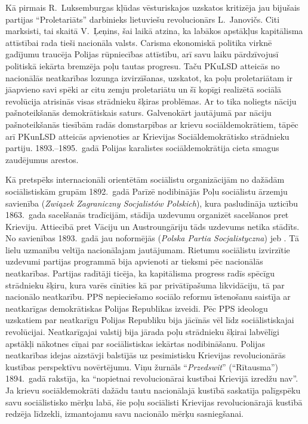 \documentclass[twoside,a5paper,12pt,fleqn,openany]{extbook}
\newcommand{\pltxti}[1]{\textit{\textpolish{#1}}}
\begin{document}
Kā pirmais R.~Luksemburgas kļūdas vēsturiskajos uzskatos kritizēja jau bijušais partijas ``Proletariāts'' darbinieks lietuviešu revolucionārs L.~Janovičs. Citi marksisti, tai skaitā V.~Ļeņins, šai laikā atzina, ka labākos apstākļus kapitālisma attīstībai rada tieši nacionāla valsts. Carisma ekonomiskā politika virknē gadījumu traucēja Polijas rūpniecības attīstību, arī savu laiku pārdzīvojusī politiskā iekārta bremzēja poļu tautas progresu. Taču PKuLSD atteicās no nacionālās neatkarības lozunga izvirzīšanas, uzskatot, ka poļu proletariātam ir jāapvieno savi spēki ar citu zemju proletariātu un šī kopīgi realizētā sociālā revolūcija atrisinās visas strādnieku šķiras problēmas. Ar to tika noliegts nāciju pašnoteikšanās demokrātiskais saturs. Galvenokārt jautājumā par nāciju pašnoteikšanās tiesībām radās domstarpības ar krievu sociāldemokrātiem, tāpēc arī PKunLSD atteicās apvienoties ar Krievijas Sociāldemokrātisko strādnieku partiju. 1893.--1895.~gadā Polijas karalistes sociāldemokrātija cieta smagus zaudējumus arestos.

Kā pretspēks internacionāli orientētām sociālistu organizācijām no dažādām sociālistiskām grupām 1892.~gadā Parīzē nodibinājās Poļu sociālistu ārzemju savienība (\pltxti{Związek Zagraniczny Socjalistów Polskich}), kura pasludināja uzticību 1863.~gada sacelšanās tradīcijām, stādīja uzdevumu organizēt sacelšanos pret Krieviju. Attiecībā pret Vāciju un Austroungāriju tāds uzdevums netika stādīts. No savienības 1893.~gadā jau noformējās  (\pltxti{Polska Partia Socjalistyczna}) jeb . Tā lielu uzmanību veltīja nacionālajam jautājumam. Rietumu sociālistu izvirzītie uzdevumi partijas programmā bija apvienoti ar tieksmi pēc nacionālās neatkarības. Partijas radītāji ticēja, ka kapitālisma progress radīs spēcīgu strādnieku šķiru, kura varēs cīnīties kā par privātīpašuma likvidāciju, tā par nacionālo neatkarību. PPS nepieciešamo sociālo reformu īstenošanu saistīja ar neatkarīgas demokrātiskas Polijas Republikas izveidi. Pēc PPS ideologu uzskatiem par neatkarīgu Polijas Republiku bija jācīnās vēl līdz sociālistiskajai revolūcijai. Neatkarīgajai valstij bija jārada poļu strādnieku šķirai labvēlīgi apstākļi nākotnes cīņai par sociālistiskas iekārtas nodibināšanu. Polijas neatkarības idejas aizstāvji balstījās uz pesimistisku Krievijas revolucionārās kustības perspektīvu novērtējumu. Viņu žurnāls ``\pltxti{Przedswit}'' (``Rītausma'') 1894.~gadā rakstīja, ka ``nopietnai revolucionārai kustībai Krievijā izredžu nav''. Ja krievu sociāldemokrāti dažādu tautu nacionālajā kustībā saskatīja palīgspēku savu sociālistisko mērķu labā, šie poļu sociālisti Krievijas revolucionārajā kustībā redzēja līdzekli, izmantojamu savu nacionālo mērķu sasniegšanai.
\end{document}
